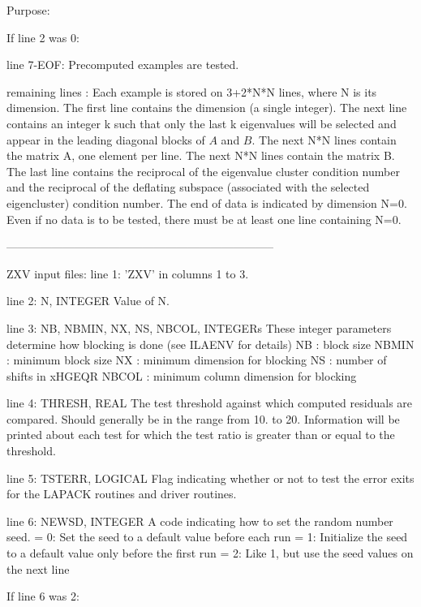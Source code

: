 \begin{DoxyParagraph}{Purpose\+: }
\begin{DoxyVerb}
 If line 2 was 0:

 line 7-EOF: Precomputed examples are tested.

 remaining lines : Each example is stored on 3+2*N*N lines, where N is
          its dimension. The first line contains the dimension (a
          single integer).  The next line contains an integer k such
          that only the last k eigenvalues will be selected and appear
          in the leading diagonal blocks of $A$ and $B$. The next N*N
          lines contain the matrix A, one element per line. The next N*N
          lines contain the matrix B. The last line contains the
          reciprocal of the eigenvalue cluster condition number and the
          reciprocal of the deflating subspace (associated with the
          selected eigencluster) condition number.  The end of data is
          indicated by dimension N=0.  Even if no data is to be tested,
          there must be at least one line containing N=0.

-----------------------------------------------------------------------

 ZXV input files:
 line 1:  'ZXV' in columns 1 to 3.

 line 2:  N, INTEGER
          Value of N.

 line 3:  NB, NBMIN, NX, NS, NBCOL, INTEGERs
          These integer parameters determine how blocking is done
          (see ILAENV for details)
          NB     : block size
          NBMIN  : minimum block size
          NX     : minimum dimension for blocking
          NS     : number of shifts in xHGEQR
          NBCOL  : minimum column dimension for blocking

 line 4:  THRESH, REAL
          The test threshold against which computed residuals are
          compared. Should generally be in the range from 10. to 20.
          Information will be printed about each test for which the
          test ratio is greater than or equal to the threshold.

 line 5:  TSTERR, LOGICAL
          Flag indicating whether or not to test the error exits for
          the LAPACK routines and driver routines.

 line 6:  NEWSD, INTEGER
          A code indicating how to set the random number seed.
          = 0:  Set the seed to a default value before each run
          = 1:  Initialize the seed to a default value only before the
                first run
          = 2:  Like 1, but use the seed values on the next line

 If line 6 was 2:


\end{DoxyVerb}
\end{DoxyParagraph}
